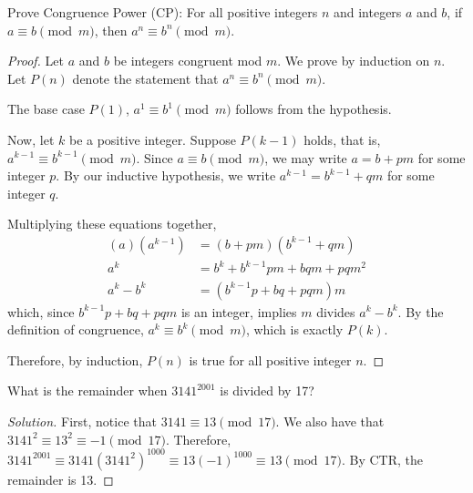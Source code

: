\documentclass{agony}
\begin{document}
\question Prove Congruence Power (CP): For all positive integers $n$ and integers $a$ and $b$,
if $a \equiv b \pmod m$, then $a^n \equiv b^n \pmod m$.
\begin{proof}
  Let $a$ and $b$ be integers congruent mod $m$.
  We prove by induction on $n$.
  Let $P(n)$ denote the statement that $a^n \equiv b^n \pmod{m}$.

  The base case $P(1)$, $a^1 \equiv b^1 \pmod{m}$ follows from the hypothesis.

  Now, let $k$ be a positive integer.
  Suppose $P(k-1)$ holds, that is, $a^{k-1} \equiv b^{k-1} \pmod{m}$.
  Since $a \equiv b \pmod{m}$, we may write $a = b + pm$ for some integer $p$.
  By our inductive hypothesis, we write $a^{k-1} = b^{k-1} + qm$ for some integer $q$.

  Multiplying these equations together, \begin{align*}
    (a)(a^{k-1}) & = (b + pm)(b^{k-1} + qm)        \\
    a^k          & = b^k + b^{k-1}pm + bqm + pqm^2 \\
    a^k - b^k    & = (b^{k-1}p + bq + pqm)m
  \end{align*}
  which, since $b^{k-1}p+bq+pqm$ is an integer, implies $m$ divides $a^k - b^k$.
  By the definition of congruence, $a^k \equiv b^k \pmod{m}$, which is exactly $P(k)$.

  Therefore, by induction, $P(n)$ is true for all positive integer $n$.
\end{proof}


\question What is the remainder when $3141^{2001}$ is divided by 17?
\begin{proof}[Solution]
  First, notice that $3141 \equiv 13 \pmod{17}$.
  We also have that $3141^2 \equiv 13^2 \equiv -1 \pmod{17}$.
  Therefore, $3141^{2001} \equiv 3141(3141^2)^{1000} \equiv 13(-1)^{1000} \equiv 13 \pmod{17}$.
  By CTR, the remainder is 13.
\end{proof}
\end{document}
